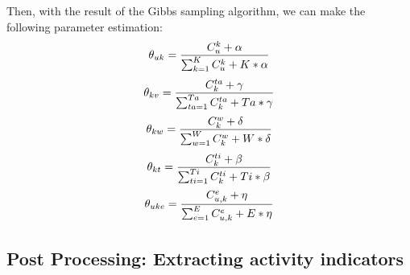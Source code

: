 {{{{{{{Then, with the result of the Gibbs sampling algorithm, we can make the following parameter estimation:
\begin{equation}\scriptsize
\theta_{uk}=\frac{ C_u^k + \alpha }{ \sum_{k=1}^K C_u^k+ K* \alpha} 
\label{eq:uk}
\end{equation}
\begin{equation}\scriptsize
\theta_{kv}=\frac{ C_k^{ta} + \gamma }{ \sum_{ta=1}^{Ta} C_k^{ta}+ Ta* \gamma}
\label{eq:kv}
\end{equation}
\begin{equation}\scriptsize
\theta_{kw}=\frac{ C_k^w + \delta }{ \sum_{w=1}^W C_k^w+ W* \delta}
\label{eq:kw}
\end{equation}
\begin{equation}\scriptsize
\theta_{kt}=\frac{ C_k^{ti} + \beta }{ \sum_{ti=1}^{Ti} C_k^{ti}+ Ti* \beta}
\label{eq:kt}
\end{equation}
\begin{equation}\scriptsize
\theta_{uke}=\frac{ C_{u,k}^e + \eta }{ \sum_{e=1}^E C_{u,k}^e+ E* \eta} 
\label{eq:uke}
\end{equation}


\subsection{Post Processing: Extracting activity indicators}\label{sec:detailed}

}}}}}}}
